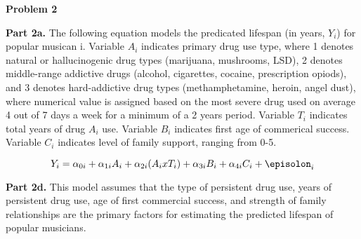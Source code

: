 \documentclass[letterpaper,12pt]{article}
\theoremstyle{definition}
\begin{document}
\noindent\newline\textbf{Problem 2}

\noindent\textbf{Part 2a.} The following equation models the predicated lifespan (in years, \(Y_i\)) for popular musican i. Variable \(A_i\) indicates primary drug use type, where 1 denotes natural or hallucinogenic drug types (marijuana, mushrooms, LSD), 2 denotes middle-range addictive drugs (alcohol, cigarettes, cocaine, prescription opiods), and 3 denotes hard-addictive drug types (methamphetamine, heroin, angel dust), where numerical value is assigned based on the most severe drug used on average 4 out of 7 days a week for a minimum of a 2 years period. Variable \(T_i\) indicates total years of drug \(A_i\) use. Variable \(B_i\) indicates first age of commerical success. Variable \(C_i\) indicates level of family support, ranging from 0-5.

\begin{equation}
Y_i = \alpha_{0i} + \alpha_{1i}A_i +\alpha_{2i}(A_i x T_i) + \alpha_{3i}B_i + \alpha_{4i}C_i + \episolon_i
\end{equation}

\noindent\newline\textbf{Part 2d.} This model assumes that the type of persistent drug use, years of persistent drug use, age of first commercial success, and strength of family relationships are the primary factors for estimating the predicted lifespan of popular musicians.
\end{document}
